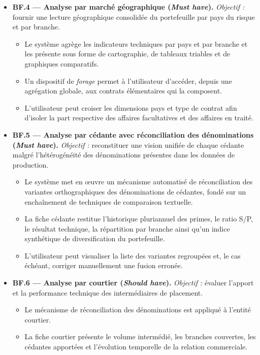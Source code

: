 \documentclass[../main.tex]{subfiles}
\begin{document}
\begin{itemize}[leftmargin=1.5cm, itemsep=6pt]

  \item \textbf{BF.4 --- Analyse par marché géographique (\textit{Must have}).}
  \emph{Objectif :} fournir une lecture géographique consolidée du portefeuille par pays du risque et par branche.
  \begin{itemize}[label=\textendash, itemsep=2pt]
    \item Le système agrège les indicateurs techniques par pays et par branche et les présente sous forme de cartographie, de tableaux triables et de graphiques comparatifs.
    \item Un dispositif de \textit{forage} permet à l'utilisateur d'accéder, depuis une agrégation globale, aux contrats élémentaires qui la composent.
    \item L'utilisateur peut croiser les dimensions pays et type de contrat afin d'isoler la part respective des affaires facultatives et des affaires en traité.
  \end{itemize}

  \item \textbf{BF.5 --- Analyse par cédante avec réconciliation des dénominations (\textit{Must have}).}
  \emph{Objectif :} reconstituer une vision unifiée de chaque cédante malgré l'hétérogénéité des dénominations présentes dans les données de production.
  \begin{itemize}[label=\textendash, itemsep=2pt]
    \item Le système met en œuvre un mécanisme automatisé de réconciliation des variantes orthographiques des dénominations de cédantes, fondé sur un enchaînement de techniques de comparaison textuelle.
    \item La fiche cédante restitue l'historique pluriannuel des primes, le ratio S/P, le résultat technique, la répartition par branche ainsi qu'un indice synthétique de diversification du portefeuille.
    \item L'utilisateur peut visualiser la liste des variantes regroupées et, le cas échéant, corriger manuellement une fusion erronée.
  \end{itemize}

  \item \textbf{BF.6 --- Analyse par courtier (\textit{Should have}).}
  \emph{Objectif :} évaluer l'apport et la performance technique des intermédiaires de placement.
  \begin{itemize}[label=\textendash, itemsep=2pt]
    \item Le mécanisme de réconciliation des dénominations est appliqué à l'entité courtier.
    \item La fiche courtier présente le volume intermédié, les branches couvertes, les cédantes apportées et l'évolution temporelle de la relation commerciale.
  \end{itemize}


\end{itemize}
\end{document}
